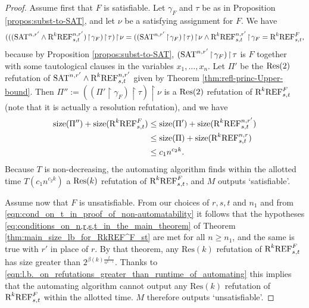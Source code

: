 \documentclass[10pt,a4paper]{article}
\theoremstyle{remark}
\newtheorem*{switching lemma}{Switching Lemma}
\newtheorem*{open problem}{Open Problem}
\theoremstyle{definition}
\begin{document}
\begin{proof}
Assume first that $F$ is satisfiable. Let $\gamma_F$ and $\tau$ be as in Proposition \ref{propos:subst-to-SAT}, and let $\nu$ be a satisfying assignment for $F$. We have
\begin{equation*}
(((\textnormal{SAT}^{n,r'} \land \textnormal{R}^k\textnormal{REF}^{n,r'}_{s,t}) \! \restriction \!  \gamma_F) \! \restriction \!  \tau) \! \restriction \!  \nu 
= ((\textnormal{SAT}^{n,r'} \! \restriction \! \gamma_F) \! \restriction \!  \tau) \! \restriction \!  \nu  \land \textnormal{R}^k\textnormal{REF}^{n,r'}_{s,t} \! \restriction \!  \gamma_F 
= \textnormal{R}^k\textnormal{REF}^{F}_{s,t},
\end{equation*}
because by Proposition \ref{propos:subst-to-SAT}, $( \textnormal{SAT}^{n,r'} \! \restriction \! \gamma_F ) \! \restriction \! \tau$ is $F$ together with some tautological clauses in the variables $x_1,\ldots, x_n$. 
Let $\Pi'$ be the $\textnormal{Res}(2)$ refutation of $\textnormal{SAT}^{n,r'} \land \textnormal{R}^k\textnormal{REF}^{n,r'}_{s,t}$ given by Theorem \ref{thm:refl-princ-Upper-bound}. 
Then $\Pi'' := ((\Pi' \! \restriction \!  \gamma_F) \! \restriction \!  \tau) \! \restriction \!  \nu$ is a $\textnormal{Res}(2)$ refutation of $\textnormal{R}^k\textnormal{REF}^{F}_{s,t}$ (note that it is actually a resolution refutation), and we have
\begin{align*}
\textnormal{size}(\Pi'') + \textnormal{size}(\textnormal{R}^k\textnormal{REF}^{F}_{s,t}) 
& \leq \textnormal{size}(\Pi') + \textnormal{size}(\textnormal{R}^k\textnormal{REF}^{n,r'}_{s,t}) \\
& \leq \textnormal{size}(\Pi) + \textnormal{size}(\textnormal{R}^k\textnormal{REF}^{n,r}_{s,t}) \\
& \leq c_1 n ^{c_2 k}.
\end{align*}
Because $T$ is non-decreasing, the automating algorithm finds within the allotted time $T(c_1 n^{c_2 k})$ a $\textnormal{Res}(k)$ refutation of $\textnormal{R}^k\textnormal{REF}^{F}_{s,t}$, and $M$ outputs `satisfiable'. 

Assume now that $F$ is unsatisfiable. From our choices of $r,s,t$ and $n_1$ and from \eqref{eqn:cond_on_t_in_proof_of_non-automatability} it follows that the hypotheses \eqref{eq:conditions_on_n,r,s,t_in_the_main_theorem} 
 of Theorem \ref{thm:main_size_lb_for_RkREF^F_st} are met for all $n \geq n_1$, and the same is true with $r'$ in place of $r$. By that theorem, any $\text{Res}(k)$ refutation of $\textnormal{R}^k\textnormal{REF}^{F}_{s,t}$ has size greater than $2^{\beta(k) \frac{t}{n^{k-1}}}$. Thanks to \eqref{eqn:l.b._on_refutations_greater_than_runtime_of_automating} this implies that the automating algorithm cannot output any $\text{Res}(k)$ refutation of $\textnormal{R}^k\textnormal{REF}^{F}_{s,t}$ within the allotted time. $M$ therefore outputs `unsatisfiable'. 
\end{proof}
\end{document}
